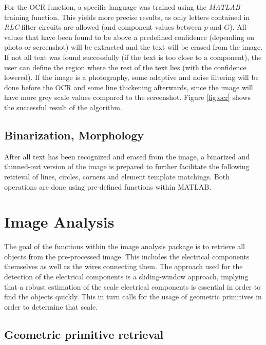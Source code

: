 \documentclass[10pt,twocolumn,letterpaper]{article}
\begin{document}
For the OCR function, a specific language was trained using the \textit{MATLAB} training function. This yields more precise results, as only letters contained in \textit{RLC}-filter circuits are allowed (and component values between $p$ and $G$). All values that have been found to be above a predefined confidence (depending on photo or screenshot) will be extracted and the text will be erased from the image. If not all text was found successfully (if the text is too close to a component), the user can define the region where the rest of the text lies (with the confidence lowered). If the image is a photography, some adaptive and noise filtering will be done before the OCR and some line thickening afterwards, since the image will have more grey scale values compared to the screenshot. Figure \ref{fig:ocr} shows the successful result of the algorithm.

\subsection{Binarization, Morphology}
\label{subsec:morph}

After all text has been recognized and erased from the image, a binarized and thinned-out version of the image is prepared to further facilitate the following retrieval of lines, circles, corners and element template matchings. Both operations are done using pre-defined functions within MATLAB.
\par


\section{Image Analysis}
\label{sec:analysis}

The goal of the functions within the image analysis package is to retrieve all objects from the pre-processed image. This includes the electrical components themselves as well as the wires connecting them. The approach used for the detection of the electrical components is a sliding-window approach, implying that a robust estimation of the scale electrical components is essential in order to find the objects quickly. This in turn calls for the usage of geometric primitives in order to determine that scale.

\subsection{Geometric primitive retrieval}
\label{subsec:geom}
\end{document}
